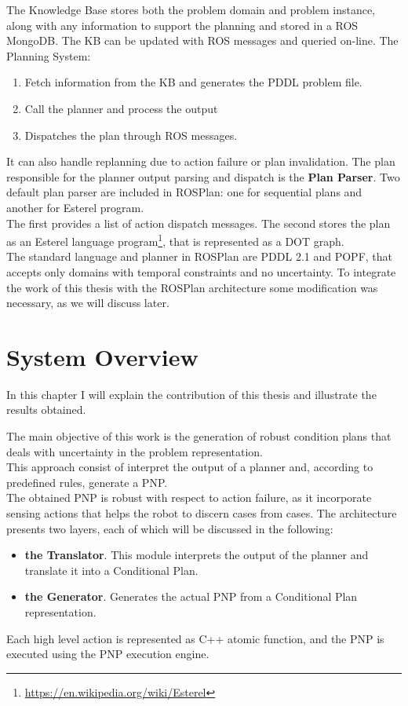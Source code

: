 \documentclass[pdftex,12pt,a4paper]{report}
\begin{document}
\noindent The Knowledge Base stores both the problem domain and problem instance, along with any information to support the planning and stored in a ROS MongoDB. The KB can be updated with ROS messages and queried on-line.
\newpage
\noindent The Planning System:
\begin{enumerate}
\item Fetch information from the KB and generates the PDDL problem file.
\item Call the planner and process the output
\item Dispatches the plan through ROS messages.
\end{enumerate}  
It can also handle replanning due to action failure or plan invalidation. The plan responsible for the planner output parsing and dispatch is the \textbf{Plan Parser}. Two default plan parser are included in ROSPlan: one for sequential plans and another for Esterel program. \\
The first provides a list of action dispatch messages. The second stores the plan as an Esterel language program\footnote{\url{https://en.wikipedia.org/wiki/Esterel}}, that is represented as a DOT graph. \\

\noindent The standard language and planner in ROSPlan are PDDL 2.1 and POPF\cite{coles2010forward},%
that accepts only domains with temporal constraints and no uncertainty. To integrate the work of this thesis with the ROSPlan architecture some modification was necessary, as we will discuss later.

\chapter{System Overview}
In this chapter I will explain the contribution of this thesis and illustrate the results obtained.\\
\newline

\noindent The main objective of this work is the generation of robust condition plans that deals with uncertainty in the problem representation.\\
This approach consist of interpret the output of a planner and, according to predefined rules, generate a PNP.\\
The obtained PNP is robust with respect to action failure, as it incorporate sensing actions that helps the robot to discern cases from cases.
The architecture presents two layers, each of which will be discussed in the following:
\begin{itemize}
\item \textbf{the Translator}. This module interprets the output of the planner and translate it into a Conditional Plan.
\item \textbf{the Generator}. Generates the actual PNP from a Conditional Plan representation.
\end{itemize}
Each high level action is represented as C++ atomic function, and the PNP is executed using the PNP execution engine.
\end{document}

